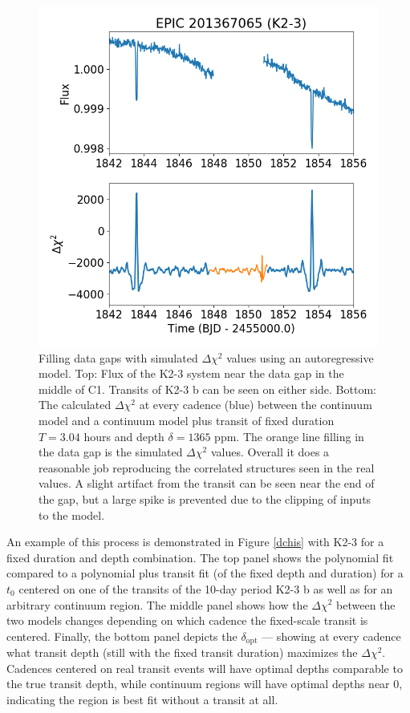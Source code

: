 \documentclass[twocolumn]{aastex62}
\begin{document}
\begin{figure}[tbp]
\includegraphics[width=\columnwidth]{deltachi_ex.png}
\caption{Filling data gaps with simulated $\Delta\chi^2$ values using
  an autoregressive model. Top: Flux of the K2-3 system near the data
  gap in the middle of C1. Transits of K2-3 b can be seen on either
  side.  Bottom: The calculated $\Delta\chi^2$ at every cadence (blue)
  between the continuum model and a continuum model plus transit of
  fixed duration $T=3.04$ hours and depth $\delta = 1365$ ppm. The
  orange line filling in the data gap is the simulated $\Delta\chi^2$
  values.  Overall it does a reasonable job reproducing the correlated
  structures seen in the real values. A slight artifact from the
  transit can be seen near the end of the gap, but a large spike is
  prevented due to the clipping of inputs to the
  model. \label{datagap}}
\end{figure}

An example of this process is demonstrated in Figure \ref{dchis} with
K2-3 for a fixed duration and depth combination.  The top panel shows
the polynomial fit compared to a polynomial plus transit fit (of the
fixed depth and duration) for a $t_0$ centered on one of the transits
of the 10-day period K2-3 b as well as for an arbitrary continuum
region.  The middle panel shows how the $\Delta\chi^2$ between the two
models changes depending on which cadence the fixed-scale transit is
centered.  Finally, the bottom panel depicts the $\delta_{\text{opt}}$
--- showing at every cadence what transit depth (still with the fixed
transit duration) maximizes the $\Delta\chi^2$. Cadences centered on
real transit events will have optimal depths comparable to the true
transit depth, while continuum regions will have optimal depths near
0, indicating the region is best fit without a transit at all.
\end{document}
